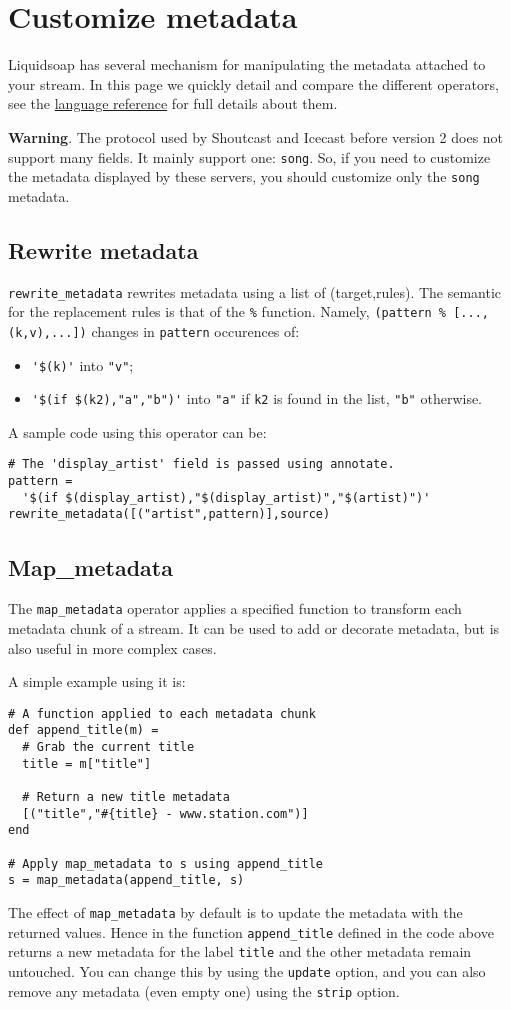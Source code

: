 \section{Customize metadata}
Liquidsoap has several mechanism for manipulating the metadata attached to your stream. In this page we quickly detail and compare the different operators, see the \href{reference.html}{language reference} for full details about them.

\textbf{Warning}. The protocol used by Shoutcast and Icecast before version 2 does not support many fields. It mainly support one: \verb+song+. So, if you need to customize the metadata displayed by these servers, you should customize only the \verb+song+ metadata.

\subsection{Rewrite metadata}
\verb+rewrite_metadata+ rewrites metadata using a list of (target,rules). The semantic for the replacement rules is that of the \verb+%+ function. Namely, \verb+(pattern % [...,(k,v),...])+ changes in \verb+pattern+ occurences of:

\begin{itemize}
\item \verb+'$(k)'+ into \verb+"v"+;
\item \verb+'$(if $(k2),"a","b")'+ into \verb+"a"+ if \verb+k2+ is found in the list, \verb+"b"+ otherwise.

\end{itemize}
A sample code using this operator can be:

\begin{verbatim}
# The 'display_artist' field is passed using annotate.
pattern = 
  '$(if $(display_artist),"$(display_artist)","$(artist)")'
rewrite_metadata([("artist",pattern)],source)
\end{verbatim}
\subsection{Map\_metadata }
The \verb+map_metadata+ operator applies a specified function to transform each metadata chunk of a stream. It can be used to add or decorate metadata, but is also useful in more complex cases.

A simple example using it is:

\begin{verbatim}
# A function applied to each metadata chunk
def append_title(m) =
  # Grab the current title
  title = m["title"]

  # Return a new title metadata
  [("title","#{title} - www.station.com")]
end

# Apply map_metadata to s using append_title
s = map_metadata(append_title, s)
\end{verbatim}
The effect of \verb+map_metadata+ by default is to update the metadata with the returned values. 
Hence in the function \verb+append_title+ defined in the code above returns a new metadata for the 
label \verb+title+ and the other metadata remain untouched. You can change this by using the 
\verb+update+ option, and you can also remove any metadata (even empty one) using the \verb+strip+ option.

